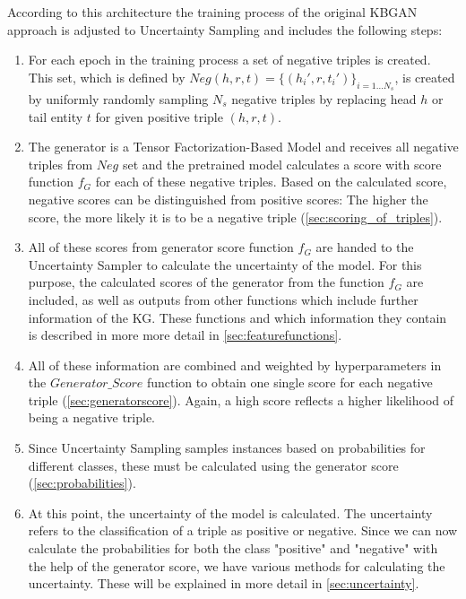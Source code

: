 According to this architecture the training process of the original \ac{KBGAN} approach is adjusted to Uncertainty Sampling and includes the following steps:
\begin{enumerate}
    \item For each epoch in the training process a set of negative triples is created.
    This set, which is defined by $Neg(h,r,t)=\{(h_i',r,t_i')\}_{i=1\dots N_s}$, is created by uniformly randomly sampling $N_s$ negative triples by replacing head $h$ or tail entity $t$ for given positive triple $(h, r, t)$.
    
    \item 
    The generator is a Tensor Factorization-Based Model and receives all negative triples from $Neg$ set and the pretrained model calculates a score with score function $f_G$ for each of these negative triples.
    Based on the calculated score, negative scores can be distinguished from positive scores:
    The higher the score, the more likely it is to be a negative triple (\autoref{sec:scoring_of_triples}).
    
    \item All of these scores from generator score function $f_G$ are handed to the Uncertainty Sampler to calculate the uncertainty of the model.
    For this purpose, the calculated scores of the generator from the function $f_G$ are included, as well as outputs from other functions which include further information of the \ac{KG}.
    These functions and which information they contain is described in more more detail in \autoref{sec:featurefunctions}.
    
    \item All of these information are combined and weighted by hyperparameters in the $Generator\_Score$ function to obtain one single score for each negative triple (\autoref{sec:generatorscore}).
    Again, a high score reflects a higher likelihood of being a negative triple.
    
    \item Since Uncertainty Sampling samples instances based on probabilities for different classes, these must be calculated using the generator score (\autoref{sec:probabilities}).

    \item At this point, the uncertainty of the model is calculated.
    The uncertainty refers to the classification of a triple as positive or negative.
    Since we can now calculate the probabilities for both the class "positive" and "negative" with the help of the generator score, we have various methods for calculating the uncertainty.
    These will be explained in more detail in \autoref{sec:uncertainty}.
    

\end{enumerate}
